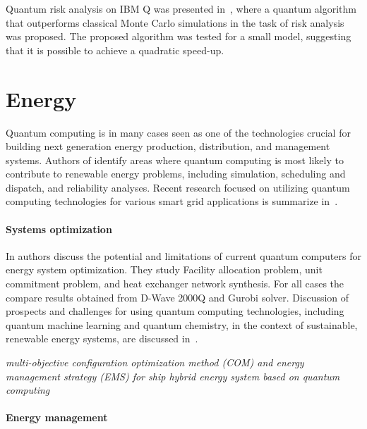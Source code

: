 \documentclass[a4paper,11pt]{article}
\begin{document}
Quantum risk analysis on IBM Q was presented in~\cite{woerner2019quantum}, where a quantum algorithm that outperforms classical Monte Carlo simulations in the task of risk analysis was proposed.  The proposed algorithm was
tested for a small model, suggesting that it is possible to achieve a quadratic speed-up.


\section{Energy}

Quantum computing is in many cases seen as one of the technologies crucial for building next generation energy production, distribution, and management systems. Authors of \cite{giani2021quantum} identify areas where quantum computing is most likely to contribute to renewable energy problems, including simulation, scheduling and dispatch, and reliability analyses. Recent research focused on utilizing quantum computing technologies for various smart grid applications is summarize in~\cite{ullah2022quantum}.


\paragraph{Systems optimization}

In \cite{ajagekar2019quantum} authors discuss the potential and limitations of current quantum computers for energy system optimization. They study 
Facility allocation problem, unit commitment problem, and heat exchanger network synthesis. For all cases the compare results obtained from D-Wave 2000Q and Gurobi solver.
Discussion of prospects and challenges for using quantum computing technologies, including quantum machine learning and quantum chemistry, in the context of sustainable, renewable energy systems, are discussed in~\cite{ajagekar2022quantum}.

\emph{multi-objective configuration optimization method (COM) and energy management strategy (EMS) for ship hybrid energy system based on quantum computing} \cite{si2022configuration}


\paragraph{Energy management}
\end{document}
